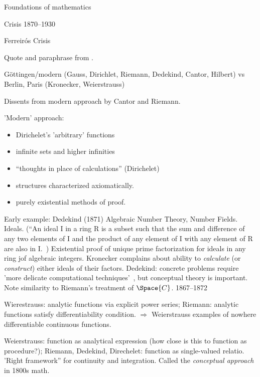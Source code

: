 \begin{plSection}{Foundations of mathematics}
\label{sec:Foundations_of_mathematics}

\begin{plSection}{Crisis 1870--1930}
\label{sec:Crisis-1870--1930}
\begin{plSection}{Ferreir\'{o}s Crisis}
\label{sec:Ferreiros_Crisis}

Quote and paraphrase from 
.

G\"{o}ttingen/modern 
(Gauss, Dirichlet, Riemann, Dedekind, Cantor, Hilbert)
vs
Berlin, Paris (Kronecker, Weierstrauss)

Dissents from modern approach by Cantor and Riemann.

'Modern' approach:
\begin{itemize}
\item Dirichelet's 'arbitrary' functions
\item infinite sets and higher infinities
\item ``thoughts in place of calculations'' (Dirichelet)
\item structures characterized axiomatically.
\item purely existential methods of proof.
\end{itemize}

Early example: Dedekind (1871) Algebraic Number Theory,
Number Fields. Ideals.
 (``An ideal I in a ring R is a subset 
 such that the sum and difference of any two elements of I 
 and the product of any element of I with any element of R 
 are also in I.~\cite{sep:DedekindFoundations})
Existential proof of unique prime factorization for
ideals in any ring jof algebraic integers.
Kronecker complains about ability to \textsl{calculate}
(or \textsl{construct})
either ideals of their factors.
Dedekind: concrete problems require 
'more delicate computational techniques'~\cite{Ferreiros:2008:Crisis},
but conceptual theory is important.
Note similarity to Riemann's treatment of $\Space{C}$.
1867--1872

Wierestrauss: analytic functions via explicit power series;
Riemann: analytic functions satisfy differentiability condition.
$\Rightarrow$ Weierstrauss examples of nowhere differentiable
continuous functions.

Weierstrauss: function as analytical expression 
(how close is this to function as procedure?);
Riemann, Dedekind, Direchelet: function as single-valued relatio.
'Right framework'' for continuity and integration.
Called the \textit{conceptual approach} in 1800s math.


\end{plSection}
\end{plSection}
\end{plSection}
